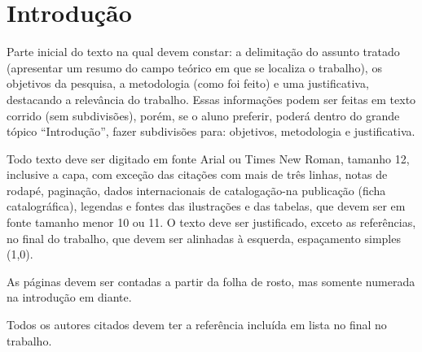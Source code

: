 \chapter{Introdução}

Parte inicial do texto na qual devem constar: a delimitação do assunto tratado (apresentar um resumo do campo teórico em que se localiza o trabalho), os objetivos da pesquisa, a metodologia (como foi feito) e uma justificativa, destacando a relevância do trabalho. Essas informações podem ser feitas em texto corrido (sem subdivisões), porém, se o aluno preferir, poderá dentro do grande tópico “Introdução”, fazer subdivisões para: objetivos, metodologia e justificativa. 

Todo texto deve ser digitado em fonte Arial ou Times New Roman, tamanho 12, inclusive a capa, com exceção das citações com mais de três linhas, notas de rodapé, paginação, dados internacionais de catalogação-na publicação (ficha catalográfica), legendas e fontes das ilustrações e das tabelas, que devem ser em fonte tamanho menor 10 ou 11. O texto deve ser justificado, exceto as referências, no final do trabalho, que devem ser alinhadas à esquerda, espaçamento simples (1,0). 

As páginas devem ser contadas a partir da folha de rosto, mas somente numerada na introdução em diante. 

Todos os autores citados devem ter a referência incluída em lista no final no trabalho. \cite{de2011associaccao}